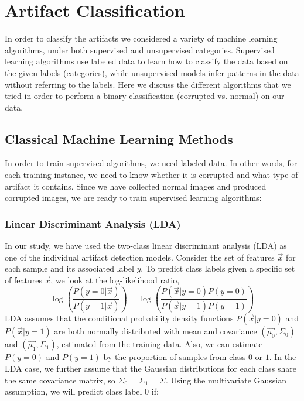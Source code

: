 \chapter{Artifact Classification}\label{Ch:classification}


In order to classify the artifacts we considered a variety of machine learning algorithms, under both supervised and unsupervised categories. Supervised learning algorithms use labeled data to learn how to classify the data based on the given labels (categories), while unsupervised models infer patterns in the data without referring to the labels. Here we discuss the different algorithms that we tried in order to perform a binary classification (corrupted vs. normal) on our data.

\section{Classical Machine Learning Methods}\label{classic}
In order to train supervised algorithms, we need labeled data. In other words, for each training instance, we need to know whether it is corrupted and what type of artifact it contains. Since we have collected normal images and produced corrupted images, we are ready to train supervised learning algorithms:

\subsection{Linear Discriminant Analysis (LDA)}

In our study, we have used the two-class linear discriminant analysis (LDA) \cite{scikit-learn} as one of the individual artifact detection models. Consider the set of features $\Vec{x}$ for each sample and its associated label $y$. To predict class labels given a specific set of features $\Vec{x}$, we look at the log-likelihood ratio,
$$ \log\left( \frac{P(y=0 | \Vec{x})}{P(y=1 | \Vec{x})} \right) = \log\left( \frac{P(\Vec{x}| y = 0) P(y = 0)}{P(\Vec{x}| y = 1) P(y = 1)} \right)$$
LDA assumes that the conditional probability density functions $P(\Vec{x} | y = 0)$ and  $P(\Vec{x} | y = 1)$ are both normally distributed with mean and covariance $(\Vec{\mu_0}, \Sigma_0)$ and $(\Vec{\mu_1}, \Sigma_1)$, estimated from the training data. Also, we can estimate $P( y = 0)$ and $P( y = 1)$ by the proportion of samples from class $0$ or $1$. In the LDA case, we further assume that the Gaussian distributions for each class share the same covariance matrix, so $\Sigma_0 = \Sigma_1 = \Sigma$. Using the multivariate Gaussian assumption, we will predict class label 0 if:

